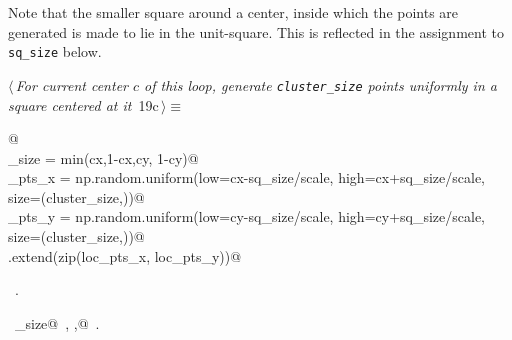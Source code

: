 \documentclass[11.5pt]{report}
\begin{document}
\vspace{-0.8cm} \newchunk Note that the smaller square around a center, inside which the points are generated is made to lie 
in the unit-square. This is reflected in the assignment to \verb|sq_size| below. 
\begin{flushleft} \small
\begin{minipage}{\linewidth}\label{scrap19}\raggedright\small
{} $\langle\,${\itshape For current center $c$ of this loop, generate \verb|cluster_size| points uniformly in a square centered at it}\nobreak\ {\footnotesize {19c}}$\,\rangle\equiv$
\vspace{-1ex}
\begin{list}{}{} \item
\mbox{}\verb@   @\\
\mbox{}\verb@sq_size      = min(cx,1-cx,cy, 1-cy)@\\
\mbox{}\verb@loc_pts_x    = np.random.uniform(low=cx-sq_size/scale, high=cx+sq_size/scale, size=(cluster_size,))@\\
\mbox{}\verb@loc_pts_y    = np.random.uniform(low=cy-sq_size/scale, high=cy+sq_size/scale, size=(cluster_size,))@\\
\mbox{}\verb@points.extend(zip(loc_pts_x, loc_pts_y))@\\
\mbox{}\verb@@{\NWsep}
\end{list}
\vspace{-1.5ex}
\footnotesize
\begin{list}{}{\setlength{\itemsep}{-\parsep}\setlength{\itemindent}{-\leftmargin}}
\item \NWtxtMacroRefIn\ .
\item \NWtxtIdentsUsed\nobreak\  \verb@cluster_size@\nobreak\ , \verb@scale,@\nobreak\ .
\item{}
\end{list}
\end{minipage}\vspace{4ex}
\end{flushleft}
\end{document}

